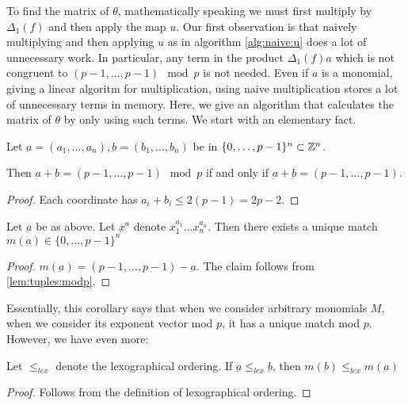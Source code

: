 To find the matrix of \(\theta\), mathematically
speaking we must first multiply by \(\Delta_{1}(f)\) 
and then apply the map \(u\).
Our first observation is that naively 
multiplying and then applying \(u\) 
as in algorithm \ref{alg:naive:u}
does a lot of unnecessary work.
In particular, any term in the 
product \(\Delta_{1}(f)a\) which 
is not congruent to 
\((p-1, \ldots, p-1) \mod p\)
is not needed. 
Even if \(a\) is a monomial, giving a linear
algoritm for multiplication, using naive
multiplication stores a lot of unnecessary terms
in memory.
Here, we give an algorithm that calculates
the matrix of \(\theta\) by only
using such terms.
We start with an elementary fact.

\begin{lem}
	\label{lem:tuples:modp}
	Let \(\underbar{a} = (a_{1}, \ldots, a_{n}),
	\underbar{b} = (b_{1}, \ldots, b_{n})\)
	be in \(\{0, \ldots, p-1\}^{n} \subset \mathbb{Z}^{n}\).

	Then \(\underbar{a} + \underbar{b} = 
	(p-1, \ldots, p-1) \mod p\)
	if and only if 
	\(\underbar{a} + \underbar{b} = 
	(p-1, \ldots, p-1)\).
\end{lem}

\begin{proof}
	Each coordinate has \(a_{i} + b_{i} \leq 2(p-1) = 2p-2\).
\end{proof}


\begin{cor}
	Let \(\underbar{a}\) be as above.
	Let \(\underbar{x}^{\underbar{a}}\)
	denote \(x_{1}^{a_{1}} \ldots x_{n}^{a_{n}}\).
	Then there exists a unique
	match \(m(\underbar{a}) \in \{0, \ldots, p-1\}^{n}\) 
\end{cor}

\begin{proof}
	\(m(\underbar{a}) = 
	(p-1, \ldots, p-1) - \underbar{a}\).
	The claim follows from 
	\ref{lem:tuples:modp}.
\end{proof}

Essentially, this corollary says that
when we consider arbitrary monomials \(M\),
when we consider its exponent vector 
mod \(p\), it has a unique
match mod \(p\).
However, we have even more:

\begin{cor}
	\label{cor:match:order}
	Let \(\leq_{lex}\) denote the 
	lexographical ordering.
	If \(\underbar{a} \leq_{lex} \underbar{b}\),
	then 
	\(m(\underbar{b}) \leq_{lex} m(\underbar{a})\)
\end{cor}

\begin{proof}
	Follows from the definition of lexographical
	ordering.
\end{proof}

